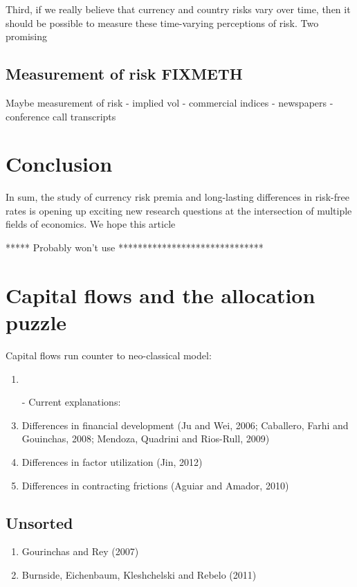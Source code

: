 \documentclass{ar-1col}
\begin{document}
Third, if we really believe that currency and country risks vary over time, then it should be possible to measure these time-varying perceptions of risk. Two promising 



\subsection{Measurement of risk FIXMETH}
Maybe measurement of risk - implied vol - commercial indices - newspapers - conference call transcripts


\section{Conclusion}

In sum, the study of currency risk premia and long-lasting differences in risk-free rates is opening up exciting new research questions at the intersection of multiple fields of economics. We hope this article  

***** Probably won't use ******************************


\section*{Capital flows and the allocation puzzle}
Capital flows run counter to neo-classical model:
\begin{enumerate}
\item \citet{GourinchasJeanne2013}
\item[-] Current explanations:
\item Differences in financial development (Ju and Wei, 2006;
  Caballero, Farhi and Gouinchas, 2008; Mendoza, Quadrini and
  Rios-Rull, 2009)
\item Differences in factor utilization (Jin, 2012)
\item Differences in contracting frictions (Aguiar and Amador, 2010)
\end{enumerate}


\subsection{Unsorted}
\begin{enumerate}
\item Gourinchas and Rey (2007)
\item Burnside, Eichenbaum, Kleshchelski and Rebelo (2011)
\end{enumerate}
\end{document}
